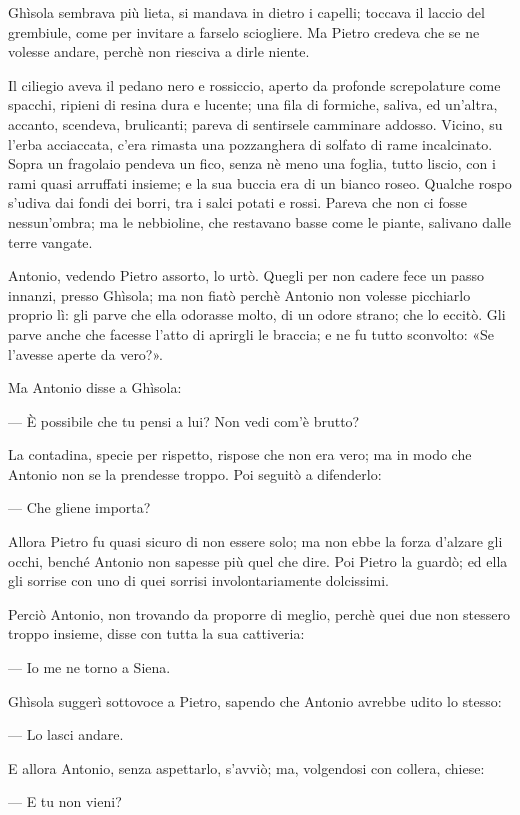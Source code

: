 Ghìsola sembrava più lieta, si mandava in dietro i capelli; toccava il laccio del grembiule, come per invitare a farselo sciogliere. Ma Pietro credeva che se ne volesse andare, perchè non riesciva a dirle niente.

Il ciliegio aveva il pedano nero e rossiccio, aperto da profonde screpolature come spacchi, ripieni di resina dura e lucente; una fila di formiche, saliva, ed un'altra, accanto, scendeva, brulicanti; pareva di sentirsele camminare addosso. Vicino, su l'erba acciaccata, c'era rimasta una pozzanghera di solfato di rame incalcinato. Sopra un fragolaio pendeva un fico, senza nè meno una foglia, tutto liscio, con i rami quasi arruffati insieme; e la sua buccia era di un bianco roseo. Qualche rospo s'udiva dai fondi dei borri, tra i salci potati e rossi. Pareva che non ci fosse nessun'ombra; ma le nebbioline, che restavano basse come le piante, salivano dalle terre vangate.

Antonio, vedendo Pietro assorto, lo urtò. Quegli per non cadere fece un passo innanzi, presso Ghìsola; ma non fiatò perchè Antonio non volesse picchiarlo proprio lì: gli parve che ella odorasse molto, di un odore strano; che lo eccitò. Gli parve anche che facesse l'atto di aprirgli le braccia; e ne fu tutto sconvolto: «Se l'avesse aperte da vero?».

Ma Antonio disse a Ghìsola:

— È possibile che tu pensi a lui? Non vedi com'è brutto?

La contadina, specie per rispetto, rispose che non era vero; ma in modo che Antonio non se la prendesse troppo. Poi seguitò a difenderlo:

— Che gliene importa?

Allora Pietro fu quasi sicuro di non essere solo; ma non ebbe la forza d'alzare gli occhi, benché Antonio non sapesse più quel che dire. Poi Pietro la guardò; ed ella gli sorrise con uno di quei sorrisi involontariamente dolcissimi.

Perciò Antonio, non trovando da proporre di meglio, perchè quei due non stessero troppo insieme, disse con tutta la sua cattiveria:

— Io me ne torno a Siena.

Ghìsola suggerì sottovoce a Pietro, sapendo che Antonio avrebbe udito lo stesso:

— Lo lasci andare.

E allora Antonio, senza aspettarlo, s'avviò; ma, volgendosi con collera, chiese:

— E tu non vieni?

